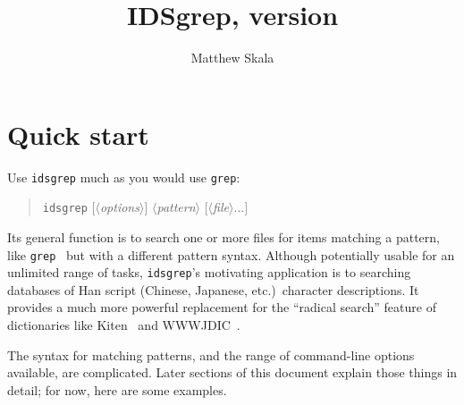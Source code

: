 \documentclass[twocolumn]{report}
\title{IDSgrep, version \idsgrepversion}
\author{Matthew Skala}
\makeatletter
\renewcommand\maketitle{%
  \begin{titlepage}%
    \let\footnotesize\small
    \let\footnoterule\relax
    \let \footnote \thanks
    \vspace*{\fill}
    \vspace*{\fill}
    {\sffamily\bfseries\huge \hfill\@title\hfill\null\par}
    \vspace{\fill}
    {\sffamily\bfseries\Large \hfill\@author\hfill\null\par}
    \vspace{\fill}
    \vspace{\fill}
    \vspace{\fill}
    \vspace{\fill}
    \vspace{\fill}
    {\sffamily\bfseries\Large \hfill\@date\par}
    \vspace*{\fill}
    \@thanks\par
    \null
  \end{titlepage}%
  \setcounter{footnote}{0}%
  \global\let\thanks\relax
  \global\let\maketitle\relax
  \global\let\@thanks\@empty
  \global\let\@author\@empty
  \global\let\@date\@empty
  \global\let\@title\@empty
  \global\let\title\relax
  \global\let\author\relax
  \global\let\date\relax
  \global\let\and\relax
}
\makeatother
\begin{document}
\maketitle

\setcounter{page}{2}

\renewcommand{\cfttoctitlefont}{%
  \huge\sffamily\bfseries}
\renewcommand{\cftaftertoctitle}{%
  {\huge\,\leaders\hrule height 0.2ex\hfill\null\vspace*{-4ex}}}

\def\gobbtohfil#1{%
  \begingroup\if#1\hfil\else\aftergroup\gobbtohfil\fi\endgroup}

\renewcommand{\cftchappresnum}{\gobbtohfil}
\renewcommand{\cftchapnumwidth}{0pt}
\renewcommand{\cftchapfont}{\sffamily\bfseries}
\renewcommand{\cftchappagefont}{\sffamily\bfseries}

\renewcommand{\cftsecpresnum}{\gobbtohfil}
\renewcommand{\cftsecnumwidth}{0pt}

\renewcommand{\cftsubsecpresnum}{\gobbtohfil}
\renewcommand{\cftsubsecnumwidth}{0pt}

\tableofcontents


\chapter{Quick start}

\noindent
Use \texttt{idsgrep} much as you would use \texttt{grep}:

\begin{quotation}
  \texttt{idsgrep}
    \textit{$[\langle$options$\rangle]$}
    \textit{$\langle$pattern$\rangle$}
    \textit{$[\langle$file$\rangle\ldots ]$}
\end{quotation}

Its general function is to search one or more files for items matching a
pattern, like \texttt{grep}~\cite{grep} but with a different pattern
syntax.  Although potentially usable for an unlimited range of tasks,
\texttt{idsgrep}'s motivating application is to searching databases of Han
script (Chinese, Japanese, etc.)\ character descriptions.  It provides a
much more powerful replacement for the ``radical search'' feature of
dictionaries like Kiten~\cite{Kiten} and WWWJDIC~\cite{WWWJDIC}.

The syntax for matching patterns, and the range of command-line options
available, are complicated.  Later sections of this document explain those
things in detail; for now, here are some examples.
\end{document}
